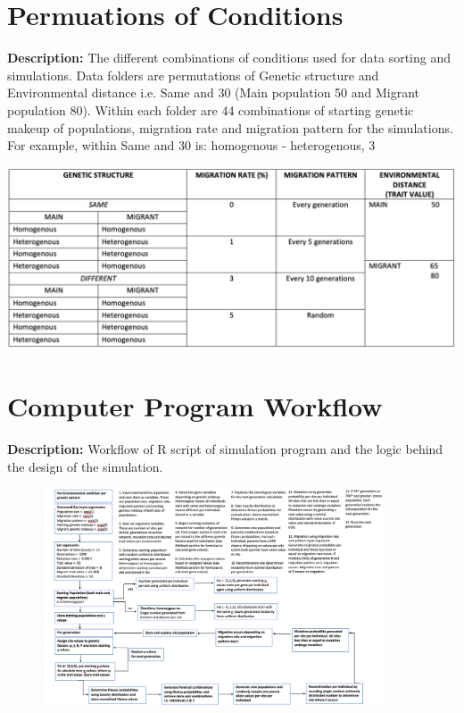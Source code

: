 \documentclass[11pt]{article}
\begin{document}
\begin{appendices}
\section{Permuations of Conditions}
\textbf{Description:} The different combinations of conditions used for data sorting and simulations. Data folders are permutations of Genetic structure and Environmental distance i.e. Same and 30 (Main population 50 and Migrant population 80). Within each folder are 44 combinations of starting genetic makeup of populations, migration rate and migration pattern for the simulations. For example, within Same and 30 is: homogenous - heterogenous, 3%
\begin{table}[h]
\centering
\includegraphics[scale=0.40]{../Results/AppendixI_conditions.jpg}
\end{table}

\newpage

\section{Computer Program Workflow}
\textbf{Description:} Workflow of R script of simulation program and the logic behind the design of the simulation.
\begin{figure}[h]
\centering
    \includegraphics[width=0.9\textwidth]{../Results/workflow.jpg}
\end{figure}

\end{appendices}
\end{document}
